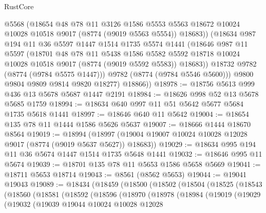 \begin{lexlean}{RustCore}
\begin{coremodule}
              @5568
              (@18654
                @48
                @78
                @11
                @3126
                @1586
                @5553
                @5563
                @18672
                @10024
                @10028
                @10518
                @9017
                (@8774 (@9019 @5563 @5554))
                @18683))
            (@18634
              @987
              @194
              @11
              @36
              @5597
              @1447
              @1514
              @1735
              @5574
              @1441
              (@18646
                @987
                @11
                @5597
                (@18701
                  @48
                  @78
                  @11
                  @5438
                  @1586
                  @5582
                  @5592
                  @18718
                  @10024
                  @10028
                  @10518
                  @9017
                  (@8774 (@9019 @5592 @5583))
                  @18683))
              @18732
              @9782
              (@8774 (@9784 @5575 @1447)))
            @9782
            (@8774 (@9784 @5546 @5600)))
          @9800
          @9804
          @9809
          @9814
          @9820
          @18277)
        @18866))
@18978 := @18756 @5613 @999 @436 @13 @5678 @5687 @1447 @2191
@18984 := @18626 @998 @52 @13 @5678 @5685 @1759
@18994 := @18634 @640 @997 @11 @51 @5642 @5677 @5684 @1735 @5618 @1441
@18997 := @18646 @640 @11 @5642
@19004 := @18654 @135 @78 @11 @1444 @1586 @5626 @5637
@19007 := @18666 @1444 @18670 @8564
@19019 := @18994
    (@18997 (@19004 @19007 @10024 @10028 @12028 @9017 (@8774 (@9019 @5637 @5627)) @18683))
@19029 := @18634 @995 @194 @11 @36 @5674 @1447 @1514 @1735 @5648 @1441
@19032 := @18646 @995 @11 @5674
@19039 := @18701 @135 @78 @11 @5653 @1586 @5658 @5669
@19041 := @18711 @5653 @18714
@19043 := @8561 (@8562 @5653)
@19044 := @19041 @19043
@19089 := @18434
    (@18459
      (@18500
        (@18502
          (@18504
            (@18525
              (@18543
                (@18560
                  (@18581
                    (@18592
                      (@18596
                        (@18970
                          (@18978
                            (@18984
                              (@19019
                                (@19029
                                  (@19032
                                    (@19039
                                      @19044
                                      @10024
                                      @10028
                                      @12028

\end{coremodule}
\end{lexlean}
